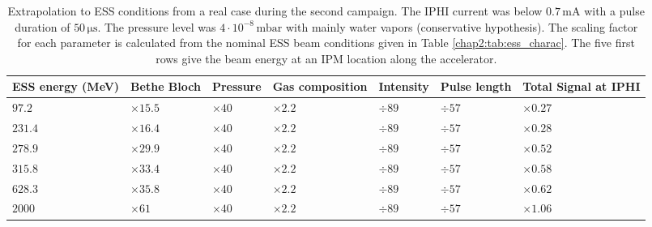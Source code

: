 \begin{table}[ht]
  \centering
  \caption[Extrapolation to ESS conditions from a real case during the second campaign]
  {Extrapolation to ESS conditions from a real case during the second campaign.
    The IPHI current was below $0.7\,\mathrm{mA}$ with a pulse duration of $50\, \mathrm{\mu s}$. The pressure level was $4 \cdot 10^{-8}\,\mathrm{mbar}$ with mainly water vapors (conservative hypothesis). The scaling factor for each parameter is calculated from the nominal ESS beam conditions given in Table \ref{chap2:tab:ess_charac}. The five first rows give the beam energy at an IPM location along the accelerator.}
  \label{chap4:extrapolationMCP}
  \begin{tabularx}{\linewidth}{XXXXXXX}
    \toprule    ESS energy (MeV) & Bethe Bloch   & Pressure     & Gas composition & Intensity & Pulse length & Total Signal at IPHI        \\
    \midrule
    \(97.2\)                     & $\times 15.5$ & $\times 40 $ & $\times 2.2$    & $\div89$  & $\div57$     & $\times 0.27$ \\
    \(231.4\)                    & $\times 16.4$ & $\times 40$  & $\times 2.2$    & $\div89$  & $\div57$     & $\times 0.28$ \\
    \(278.9\)                    & $\times 29.9$ & $\times 40$  & $\times 2.2$    & $\div89$  & $\div57$     & $\times 0.52$ \\
    \(315.8\)                    & $\times 33.4$ & $\times 40$  & $\times 2.2$    & $\div89$  & $\div57$     & $\times 0.58$ \\
    \(628.3\)                    & $\times 35.8$ & $\times 40$  & $\times 2.2$    & $\div89$  & $\div57$     & $\times 0.62$ \\
    \(2000\)                   & $\times 61$   & $\times 40$  & $\times 2.2$    & $\div89$  & $\div57$     & $\times 1.06$ \\
    \bottomrule
  \end{tabularx}
\end{table}
